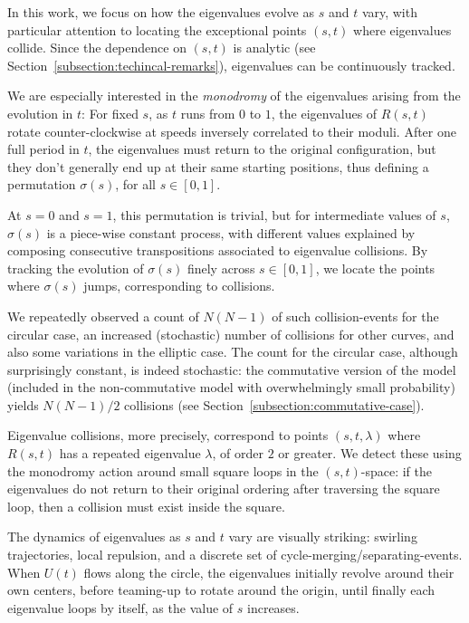 \documentclass{article}
\begin{document}
	In this work, we focus on how the eigenvalues evolve as $s$ and $t$ vary, 
	with particular attention to locating the exceptional points $(s,t)$ where eigenvalues collide. 
	Since the dependence on $(s,t)$ is analytic (see Section~\ref{subsection:techincal-remarks}), 
	eigenvalues can be continuously tracked.

	We are especially interested in the \emph{monodromy} of the eigenvalues 
	arising from the evolution in $t$: 
	For fixed $s$, as $t$ runs from $0$ to $1$, the eigenvalues of $R(s,t)$ 
	rotate counter-clockwise at speeds inversely correlated to their moduli.
	After one full period in $t$, the eigenvalues must return to the 
	original configuration, but they don't generally end up at their 
	same starting positions, 
	thus defining a permutation $\sigma(s)$, for all $s\in [0,1]$.

	At $s=0$ and $s=1$, this permutation is trivial, but for intermediate values of $s$, 
	$\sigma(s)$ is a piece-wise constant process, 
	with different values explained by composing consecutive transpositions 
	associated to eigenvalue collisions.
	By tracking the evolution of $\sigma(s)$ finely across $s \in [0,1]$, 
	we locate the points where $\sigma(s)$ jumps, corresponding to collisions.
	
	We repeatedly observed a count of $N(N-1)$ 
	of such collision-events for the circular case, 
	an increased (stochastic) number of collisions for other curves, 
	and also some variations in the elliptic case. 
	The count for the circular case, although surprisingly constant, is indeed stochastic: 
	the commutative version of the model 
	(included in the non-commutative model with overwhelmingly small probability) 
	yields $N(N-1)/2$ collisions (see Section~\ref{subsection:commutative-case}). 
	
	Eigenvalue collisions, more precisely, correspond to points $(s,t,\lambda)$ 
	where $R(s,t)$ has a repeated eigenvalue $\lambda$, of order $2$ or greater.
	We detect these using the monodromy action around small square loops in the $(s,t)$-space: 
	if the eigenvalues do not return to their original ordering after traversing the square loop, 
	then a collision must exist inside the square.
	
	The dynamics of eigenvalues as $s$ and $t$ vary are visually striking: 
	swirling trajectories, local repulsion, and a discrete set of cycle-merging/separating-events.
	When $U(t)$ flows along the circle, the eigenvalues initially revolve 
	around their own centers, before teaming-up to rotate around the origin,
	until finally each eigenvalue loops by itself, as the value of $s$ increases.
	
\end{document}
